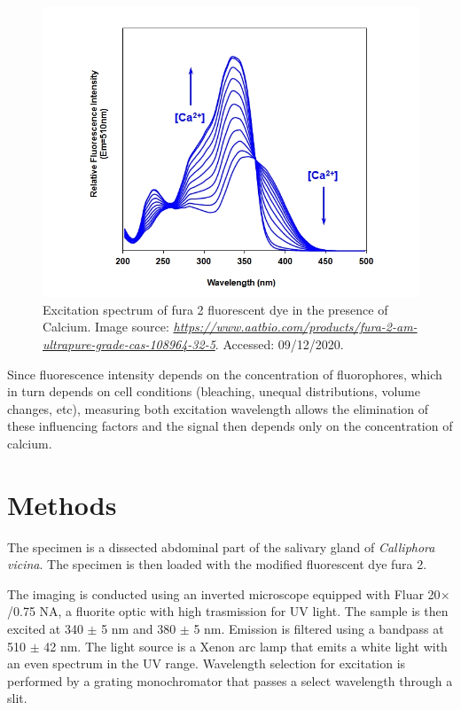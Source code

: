 \begin{figure}[h]
\centering
\includegraphics[width=.5\columnwidth]{Exp_8_CaImaging/Figures/fura2aatbio2}
\caption{Excitation spectrum of fura 2 fluorescent dye in the presence of Calcium. 
Image source: \href{https://www.aatbio.com/products/fura-2-am-ultrapure-grade-cas-108964-32-5}{\textit{https://www.aatbio.com/products/fura-2-am-ultrapure-grade-cas-108964-32-5}}. 
Accessed: 09/12/2020.} 
\label{fig:fura2}
\end{figure}

Since fluorescence intensity depends on the concentration of fluorophores, which in turn depends on cell conditions (bleaching, unequal distributions, volume changes, etc), measuring both excitation wavelength allows the elimination of these influencing factors and the signal then depends only on the concentration of calcium.


\section{Methods}

The specimen is a dissected abdominal part of the salivary gland of \textit{Calliphora vicina}. 
The specimen is then loaded with the modified fluorescent dye fura 2. 

The imaging is conducted using an inverted microscope equipped with Fluar 20$\times$/0.75 NA, a fluorite optic with high trasmission for UV light. 
The sample is then excited at 340 $\pm$ 5 nm and 380 $\pm$ 5 nm. 
Emission is filtered using a bandpass at 510 $\pm$ 42 nm. 
The light source is a Xenon arc lamp that emits a white light with an even spectrum in the UV range. 
Wavelength selection for excitation is performed by a grating monochromator that passes a select wavelength through a slit.  

